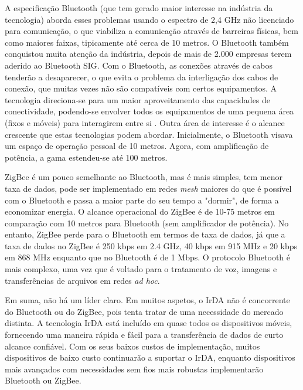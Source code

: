 \documentclass[conference]{IEEEtran}
\begin{document}
A especificação Bluetooth (que tem gerado maior interesse na indústria da tecnologia) aborda esses problemas usando o espectro de 2,4 GHz não licenciado para comunicação, o que viabiliza a comunicação através de barreiras físicas, bem como maiores faixas, tipicamente até cerca de 10 metros. O Bluetooth também conquistou muita atenção da indústria, depois de mais de 2.000 empresas terem aderido ao Bluetooth SIG. Com o Bluetooth, as conexões através de cabos tenderão a desaparecer, o que evita o problema da interligação dos cabos de conexão, que muitas vezes não são compatíveis com certos equipamentos. A tecnologia direciona-se para um maior aproveitamento das capacidades de conectividade, podendo-se envolver todos os equipamentos de uma pequena área (fixos e móveis) para interagirem entre si \cite{kobayashi2004tecnologia}. Outra área de interesse é o alcance crescente que estas tecnologias podem abordar. Inicialmente, o Bluetooth visava um espaço de operação pessoal de 10 metros. Agora, com amplificação de potência, a gama estendeu-se até 100 metros.

ZigBee é um pouco semelhante ao Bluetooth, mas é mais simples, tem menor taxa de dados, pode ser implementado em redes \textit{mesh} maiores do que é possível com o Bluetooth e passa a maior parte do seu tempo a "dormir", de forma a economizar energia. O alcance operacional do ZigBee é de 10-75 metros em comparação com 10 metros para Bluetooth (sem amplificador de potência). No entanto, ZigBee perde para o Bluetooth em termos de taxa de dados, já que a taxa de dados no ZigBee é 250 kbps em 2.4 GHz, 40 kbps em 915 MHz e 20 kbps em 868 MHz enquanto que no Bluetooth é de 1 Mbps. O protocolo Bluetooth é mais complexo, uma vez que é voltado para o tratamento de voz, imagens e transferências de arquivos em redes \textit{ad hoc}. 

Em suma, não há um líder claro. Em muitos aspetos, o IrDA não é concorrente do Bluetooth ou do ZigBee, pois tenta tratar de uma necessidade do mercado distinta. A tecnologia IrDA está incluído em quase todos os dispositivos móveis, fornecendo uma maneira rápida e fácil para a transferência de dados de curto alcance confiável. Com os seus baixos custos de implementação, muitos dispositivos de baixo custo continuarão a suportar o IrDA, enquanto dispositivos mais avançados com necessidades sem fios mais robustas implementarão Bluetooth ou ZigBee.

{}

\end{document}
